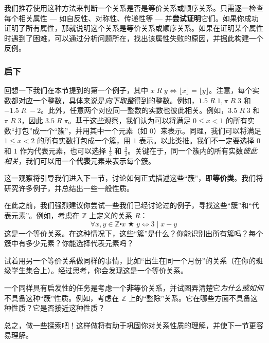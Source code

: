我们推荐使用这种方法来判断一个关系是否是等价关系或顺序关系。只需逐一检查每个相关属性 --- 如自反性、对称性、传递性等 --- 并\textbf{尝试证明}它们。如果你成功证明了所有属性，那就说明这个关系是等价关系或顺序关系。如果在证明某个属性时遇到了困难，可以通过分析问题所在，找出该属性失败的原因，并据此构建一个反例。

\subsubsection*{启下}

回想一下我们在本节提到的第一个例子，其中 $x \;R\; y \iff \lfloor x \rfloor = \lfloor y \rfloor$。注意，每个实数都对应一个整数，具体来说是\emph{向下取整}得到的整数。例如，$1.5 \;R\; 1, \pi \;R\; 3$ 和 $-1.5 \;R\; -2$。此外，任意两个对应同一整数的实数也彼此相关。例如，$3.5 \;R\; 3$ 和 $\pi \;R\; 3$，因此 $3.5 \;R\; \pi$。基于这些观察，我们认为可以将满足 $0 \le x < 1$ 的所有实数``打包''成一个``簇''，并用其中一个元素（如 $0$）来表示。同理，我们可以将满足 $1 \le x < 2$ 的所有实数打包成一个簇，用 $1$ 表示。以此类推。我们不一定要选择 $0$ 和 $1$ 作为代表元素，也可以选择 $\frac{1}{2}$ 和 $\frac{3}{2}$。关键在于，同一个簇内的所有实数\emph{彼此相关}，我们可以用一个\textbf{代表}元素来表示每个簇。

这一观察将引导我们进入下一节，讨论如何正式描述这些``簇''，即\textbf{等价类}。我们将研究许多例子，并总结出一些一般性质。

在此之前，我们强烈建议你尝试一些我们已经讨论过的例子，寻找这些``簇''和``代表元素''。例如，考虑在 $\mathbb{Z}$ 上定义的关系 $R$：
\[\forall x, y \in \mathbb{Z} \centerdot x \;\bigstar\; y \iff 3 \mid x - y\]
这是一个等价关系。在这种情况下，这些``簇''是什么？你能识别出所有簇吗？每个簇中有多少元素？你能选择代表元素吗？

试着用另一个等价关系做同样的事情，比如``出生在同一个月份''的关系（在你的班级学生集合上）。经过思考，你会发现这是一个等价关系。

一个同样具有启发性的任务是考虑一个\textbf{非}等价关系，并试图弄清楚它\emph{为什么或如何}不具备这种``簇''性质。例如，考虑在 $\mathbb{Z}$ 上的``整除''关系。它在哪些方面不具备这种性质？它是否接近这种性质？

总之，做一些探索吧！这样做将有助于巩固你对关系性质的理解，并使下一节更容易理解。
